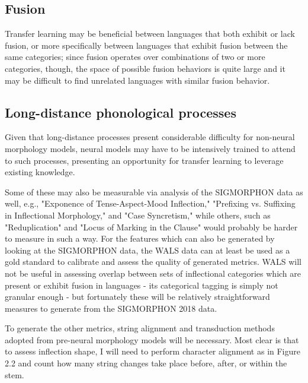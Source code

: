 \subsection{Fusion}

Transfer learning may be beneficial between languages that both exhibit or lack fusion, or more specifically between languages that exhibit fusion between the same categories; since fusion operates over combinations of two or more categories, though, the space of possible fusion behaviors is quite large and it may be difficult to find unrelated languages with similar fusion behavior. 

\subsection{Long-distance phonological processes}

Given that long-distance processes present considerable difficulty for non-neural morphology models, neural models may have to be intensively trained to attend to such processes, presenting an opportunity for transfer learning to leverage existing knowledge.

Some of these may also be measurable via analysis of the SIGMORPHON data as well, e.g., "Exponence of Tense-Aspect-Mood Inflection," "Prefixing vs. Suffixing in Inflectional Morphology," and "Case Syncretism," while others, such as "Reduplication" and "Locus of Marking in the Clause" would probably be harder to measure in such a way. For the features which can also be generated by looking at the SIGMORPHON data, the WALS data can at least be used as a gold standard to calibrate and assess the quality of generated metrics. WALS will not be useful in assessing overlap between sets of inflectional categories which are present or exhibit fusion in languages - its categorical tagging is simply not granular enough - but fortunately these will be relatively straightforward measures to generate from the SIGMORPHON 2018 data.

To generate the other metrics, string alignment and transduction methods adopted from pre-neural morphology models will be necessary. Most clear is that to assess inflection shape, I will need to perform character alignment as in Figure 2.2 and count how many string changes take place before, after, or within the stem. 

